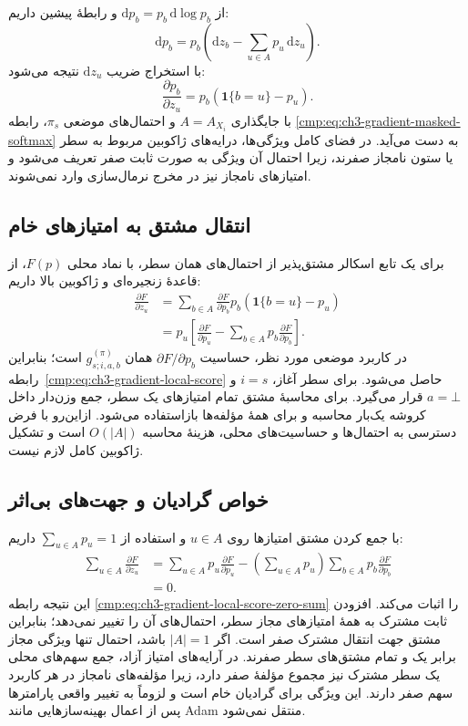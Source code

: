 از $\mathrm dp_b=p_b\,\mathrm d\log p_b$
و رابطهٔ پیشین داریم:
\[
\mathrm dp_b=p_b\left(\mathrm dz_b
-\sum_{u\in A}p_u\,\mathrm dz_u\right).
\]
با استخراج ضریب $\mathrm dz_u$ نتیجه می‌شود:
\[
\frac{\partial p_b}{\partial z_u}
=p_b(\mathbf1\{b=u\}-p_u).
\]
با جایگذاری $A=A_{X_i}$ و احتمال‌های
موضعی $\pi_s$، رابطه
\eqref{cmp:eq:ch3-gradient-masked-softmax}
به دست می‌آید. در فضای کامل ویژگی‌ها،
درایه‌های ژاکوبین مربوط به سطر یا ستون
نامجاز صفرند، زیرا احتمال آن ویژگی به
صورت ثابت صفر تعریف می‌شود و امتیازهای
نامجاز نیز در مخرج نرمال‌سازی وارد نمی‌شوند.

\subsection{انتقال مشتق به امتیازهای خام}
\label{app:ch3-gradient-raw-scores}

برای یک تابع اسکالر مشتق‌پذیر از احتمال‌های
همان سطر، با نماد محلی $F(p)$، از قاعدهٔ
زنجیره‌ای و ژاکوبین بالا داریم:
\[
\begin{aligned}
\frac{\partial F}{\partial z_u}
&=\sum_{b\in A}\frac{\partial F}{\partial p_b}
p_b(\mathbf1\{b=u\}-p_u)\\
&=p_u\left[
\frac{\partial F}{\partial p_u}
-\sum_{b\in A}p_b\frac{\partial F}{\partial p_b}
\right].
\end{aligned}
\]
در کاربرد موضعی مورد نظر، حساسیت
$\partial F/\partial p_b$ همان
$g_{s;i,a,b}^{(\pi)}$ است؛ بنابراین
رابطه~\eqref{cmp:eq:ch3-gradient-local-score}
حاصل می‌شود. برای سطر آغاز، $i=s$ و
$a=\bot$ قرار می‌گیرد.
برای محاسبهٔ مشتق تمام امتیازهای یک سطر،
جمع وزن‌دار داخل کروشه یک‌بار محاسبه و
برای همهٔ مؤلفه‌ها بازاستفاده می‌شود.
ازاین‌رو با فرض دسترسی به احتمال‌ها و
حساسیت‌های محلی، هزینهٔ محاسبه $O(|A|)$
است و تشکیل ژاکوبین کامل لازم نیست.

\subsection{خواص گرادیان و جهت‌های بی‌اثر}
\label{app:ch3-gradient-score-invariance}

با جمع کردن مشتق امتیازها روی $u\in A$
و استفاده از $\sum_{u\in A}p_u=1$ داریم:
\[
\begin{aligned}
\sum_{u\in A}\frac{\partial F}{\partial z_u}
&=\sum_{u\in A}p_u\frac{\partial F}{\partial p_u}
-\left(\sum_{u\in A}p_u\right)
\sum_{b\in A}p_b\frac{\partial F}{\partial p_b}\\
&=0.
\end{aligned}
\]
این نتیجه رابطه
\eqref{cmp:eq:ch3-gradient-local-score-zero-sum}
را اثبات می‌کند. افزودن ثابت مشترک به همهٔ
امتیازهای مجاز سطر، احتمال‌های آن را تغییر
نمی‌دهد؛ بنابراین مشتق جهت انتقال مشترک
صفر است. اگر $|A|=1$ باشد، احتمال تنها
ویژگی مجاز برابر یک و تمام مشتق‌های سطر
صفرند. در آرایه‌های امتیاز آزاد، جمع سهم‌های
محلی یک سطر مشترک نیز مجموع مؤلفهٔ صفر
دارد، زیرا مؤلفه‌های نامجاز در هر کاربرد
سهم صفر دارند. این ویژگی برای گرادیان
خام است و لزوماً به تغییر واقعی پارامترها
پس از اعمال بهینه‌سازهایی مانند Adam
منتقل نمی‌شود.

